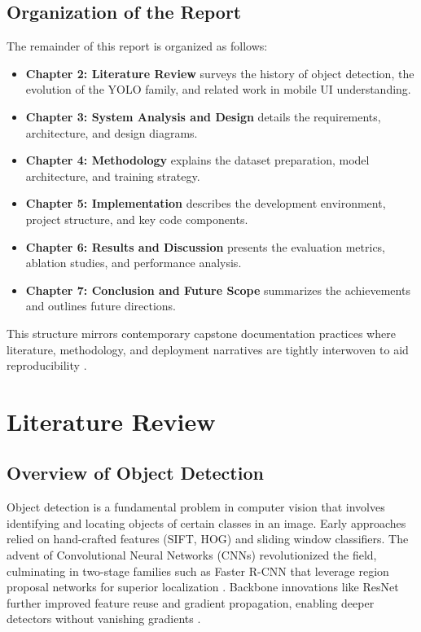 \documentclass[11pt,a4paper]{report}
\begin{document}
\section{Organization of the Report}
The remainder of this report is organized as follows:
\begin{itemize}
    \item \textbf{Chapter 2: Literature Review} surveys the history of object detection, the evolution of the YOLO family, and related work in mobile UI understanding.
    \item \textbf{Chapter 3: System Analysis and Design} details the requirements, architecture, and design diagrams.
    \item \textbf{Chapter 4: Methodology} explains the dataset preparation, model architecture, and training strategy.
    \item \textbf{Chapter 5: Implementation} describes the development environment, project structure, and key code components.
    \item \textbf{Chapter 6: Results and Discussion} presents the evaluation metrics, ablation studies, and performance analysis.
    \item \textbf{Chapter 7: Conclusion and Future Scope} summarizes the achievements and outlines future directions.
\end{itemize}
This structure mirrors contemporary capstone documentation practices where literature, methodology, and deployment narratives are tightly interwoven to aid reproducibility \cite{pytorch}\cite{docker}\cite{yolov11}.

\chapter{Literature Review}

\section{Overview of Object Detection}
Object detection is a fundamental problem in computer vision that involves identifying and locating objects of certain classes in an image. Early approaches relied on hand-crafted features (SIFT, HOG) and sliding window classifiers. The advent of Convolutional Neural Networks (CNNs) revolutionized the field, culminating in two-stage families such as Faster R-CNN that leverage region proposal networks for superior localization \cite{fasterrcnn}. Backbone innovations like ResNet further improved feature reuse and gradient propagation, enabling deeper detectors without vanishing gradients \cite{resnet}.
\end{document}
